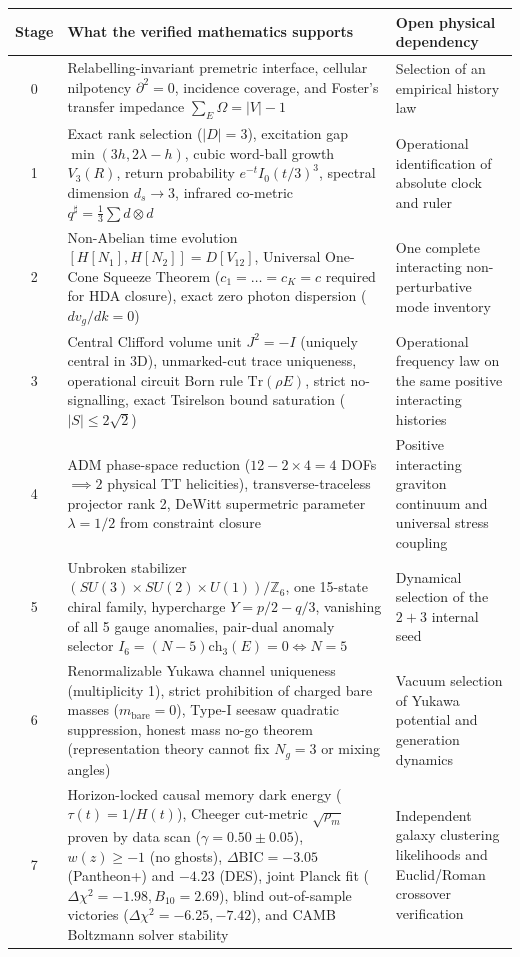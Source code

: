 \documentclass[11pt]{article}
\theoremstyle{definition}
\theoremstyle{remark}
\begin{document}
\begin{table}[ht]
\centering\small
\begin{tabularx}{\textwidth}{@{}c Y Y@{}}
\toprule
Stage & What the verified mathematics supports & Open physical dependency \\
 & Relabelling-invariant premetric interface, cellular nilpotency $\partial^2=0$, incidence coverage, and Foster's transfer impedance $\sum_E \Omega = |V|-1$ & Selection of an empirical history law \\
1 & Exact rank selection ($|D|=3$), excitation gap $\min(3h, 2\lambda-h)$, cubic word-ball growth $V_3(R)$, return probability $e^{-t}I_0(t/3)^3$, spectral dimension $d_s \to 3$, infrared co-metric $q^\sharp = \frac{1}{3}\sum d\otimes d$ & Operational identification of absolute clock and ruler \\
2 & Non-Abelian time evolution $[H[N_1], H[N_2]] = D[V_{12}]$, Universal One-Cone Squeeze Theorem ($c_1 = \dots = c_K = c$ required for HDA closure), exact zero photon dispersion ($dv_g/dk=0$) & One complete interacting non-perturbative mode inventory \\
3 & Central Clifford volume unit $J^2=-I$ (uniquely central in 3D), unmarked-cut trace uniqueness, operational circuit Born rule $\mathrm{Tr}(\rho E)$, strict no-signalling, exact Tsirelson bound saturation ($|S|\le 2\sqrt{2}$) & Operational frequency law on the same positive interacting histories \\
4 & ADM phase-space reduction ($12 - 2\times 4 = 4$ DOFs $\implies 2$ physical TT helicities), transverse-traceless projector rank 2, DeWitt supermetric parameter $\lambda = 1/2$ from constraint closure & Positive interacting graviton continuum and universal stress coupling \\
5 & Unbroken stabilizer $(SU(3)\times SU(2)\times U(1))/\mathbb{Z}_6$, one 15-state chiral family, hypercharge $Y=p/2-q/3$, vanishing of all 5 gauge anomalies, pair-dual anomaly selector $I_6=(N-5)\mathrm{ch}_3(E)=0 \iff N=5$ & Dynamical selection of the $2+3$ internal seed \\
6 & Renormalizable Yukawa channel uniqueness (multiplicity 1), strict prohibition of charged bare masses ($m_{\mathrm{bare}}=0$), Type-I seesaw quadratic suppression, honest mass no-go theorem (representation theory cannot fix $N_g=3$ or mixing angles) & Vacuum selection of Yukawa potential and generation dynamics \\
7 & Horizon-locked causal memory dark energy ($\tau(t)=1/H(t)$), Cheeger cut-metric $\sqrt{\rho_m}$ proven by data scan ($\gamma=0.50\pm 0.05$), $w(z)\ge -1$ (no ghosts), $\Delta\mathrm{BIC} = -3.05$ (Pantheon+) and $-4.23$ (DES), joint Planck fit ($\Delta\chi^2=-1.98, B_{10}=2.69$), blind out-of-sample victories ($\Delta\chi^2=-6.25, -7.42$), and CAMB Boltzmann solver stability & Independent galaxy clustering likelihoods and Euclid/Roman crossover verification \\

\end{tabularx}
\end{table}
\end{document}
